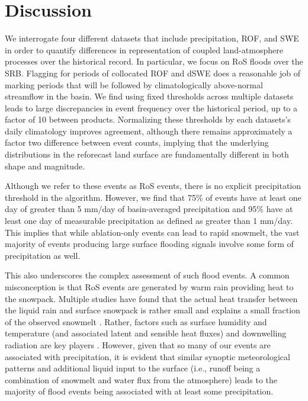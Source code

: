 \documentclass[draft]{agujournal2019}
\begin{document}
\section{Discussion}

We interrogate four different datasets that include precipitation, ROF, and SWE in order to quantify differences in representation of coupled land-atmosphere processes over the historical record. In particular, we focus on RoS floods over the SRB. Flagging for periods of collocated ROF and dSWE does a reasonable job of marking periods that will be followed by climatologically above-normal streamflow in the basin. We find using fixed thresholds across multiple datasets leads to large discrepancies in event frequency over the historical period, up to a factor of 10 between products. Normalizing these thresholds by each datasets's daily climatology improves agreement, although there remains approximately a factor two difference between event counts, implying that the underlying distributions in the reforecast land surface are fundamentally different in both shape and magnitude.

Although we refer to these events as RoS events, there is no explicit precipitation threshold in the algorithm. However, we find that 75\% of events have at least one day of greater than 5 mm/day of basin-averaged precipitation and 95\% have at least one day of measurable precipitation as defined as greater than 1 mm/day. This implies that while ablation-only events can lead to rapid snowmelt, the vast majority of events producing large surface flooding signals involve some form of precipitation as well.

This also underscores the complex assessment of such flood events. A common misconception is that RoS events are generated by warm rain providing heat to the snowpack. Multiple studies have found that the actual heat transfer between the liquid rain and surface snowpack is rather small and explains a small fraction of the observed snowmelt \citep{moore1984controls}. Rather, factors such as surface humidity and temperature (and associated latent and sensible heat fluxes) and downwelling radiation are key players \citep{wurzer2016influence,harpold2018humidity}. However, given that so many of our events are associated with precipitation, it is evident that similar synoptic meteorological patterns \citep{grote2021synoptic} and additional liquid input to the surface (i.e., runoff being a combination of snowmelt and water flux from the atmosphere) leads to the majority of flood events being associated with at least some precipitation.
\end{document}
